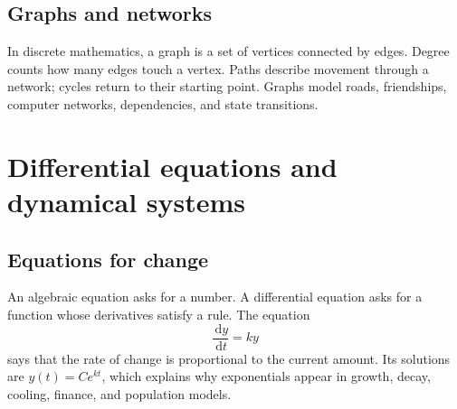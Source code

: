 \documentclass[11pt,oneside,openany]{book}
\newcommand{\dd}{\,\mathrm{d}}
\begin{document}
\begin{center}
\end{center}

\section{Graphs and networks}

In discrete mathematics, a graph is a set of vertices connected by edges. Degree counts how many edges touch a vertex. Paths describe movement through a network; cycles return to their starting point. Graphs model roads, friendships, computer networks, dependencies, and state transitions.

\begin{center}
\end{center}

\chapter{Differential equations and dynamical systems}

\section{Equations for change}

An algebraic equation asks for a number. A differential equation asks for a function whose derivatives satisfy a rule. The equation
\[
  \frac{\dd y}{\dd t}=ky
\]
says that the rate of change is proportional to the current amount. Its solutions are $y(t)=Ce^{kt}$, which explains why exponentials appear in growth, decay, cooling, finance, and population models.
\end{document}
